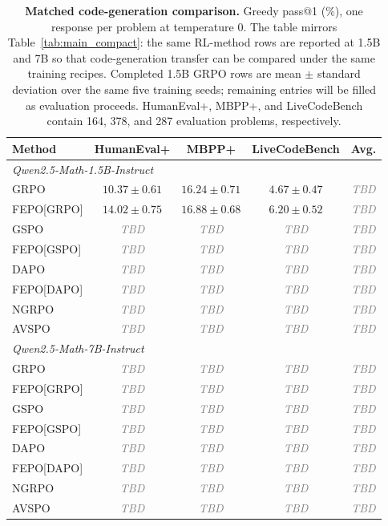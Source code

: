 \documentclass{article}
\newcommand{\TBD}{\textcolor{gray}{\textit{TBD}}}
\newcommand{\FEPO}{\textsc{FEPO}\xspace}
\begin{document}
\begin{table}[H]
\centering
\scriptsize
\setlength{\tabcolsep}{5.0pt}
\renewcommand{\arraystretch}{1.08}
\begin{tabular*}{\linewidth}{@{\extracolsep{\fill}}lcccc@{}}
\toprule
Method & HumanEval+ & MBPP+ & LiveCodeBench & Avg.\\
\midrule
\multicolumn{5}{l}{\textit{Qwen2.5-Math-1.5B-Instruct}}\\
GRPO & $10.37\pm0.61$ & $16.24\pm0.71$ & $4.67\pm0.47$ & \TBD\\
\FEPO[GRPO] & $\mathbf{14.02\pm0.75}$ & $\mathbf{16.88\pm0.68}$ & $\mathbf{6.20\pm0.52}$ & \TBD\\
GSPO & \TBD & \TBD & \TBD & \TBD\\
\FEPO[GSPO] & \TBD & \TBD & \TBD & \TBD\\
DAPO & \TBD & \TBD & \TBD & \TBD\\
\FEPO[DAPO] & \TBD & \TBD & \TBD & \TBD\\
NGRPO & \TBD & \TBD & \TBD & \TBD\\
AVSPO & \TBD & \TBD & \TBD & \TBD\\
\midrule
\multicolumn{5}{l}{\textit{Qwen2.5-Math-7B-Instruct}}\\
GRPO & \TBD & \TBD & \TBD & \TBD\\
\FEPO[GRPO] & \TBD & \TBD & \TBD & \TBD\\
GSPO & \TBD & \TBD & \TBD & \TBD\\
\FEPO[GSPO] & \TBD & \TBD & \TBD & \TBD\\
DAPO & \TBD & \TBD & \TBD & \TBD\\
\FEPO[DAPO] & \TBD & \TBD & \TBD & \TBD\\
NGRPO & \TBD & \TBD & \TBD & \TBD\\
AVSPO & \TBD & \TBD & \TBD & \TBD\\
\bottomrule
\end{tabular*}
\caption{\textbf{Matched code-generation comparison.} Greedy pass@1 (\%), one response per problem at temperature $0$. The table mirrors Table~\ref{tab:main_compact}: the same RL-method rows are reported at 1.5B and 7B so that code-generation transfer can be compared under the same training recipes. Completed 1.5B GRPO rows are mean $\pm$ standard deviation over the same five training seeds; remaining entries will be filled as evaluation proceeds. HumanEval+, MBPP+, and LiveCodeBench contain 164, 378, and 287 evaluation problems, respectively.}
\label{tab:code_generalization}
\end{table}
\end{document}
